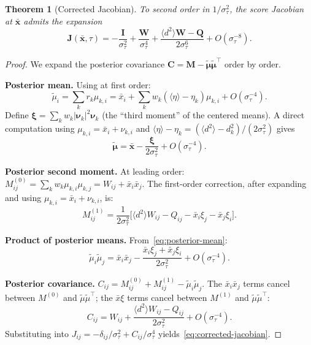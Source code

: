 \documentclass[10pt,a4paper]{amsart}
\newtheorem{theorem}{Theorem}
\begin{document}
\begin{theorem}[Corrected Jacobian]\label{thm:corrected-jacobian}
To second order in $1/\sigma_\tau^2$, the score Jacobian at $\bar{\bm{x}}$ admits the expansion
\begin{equation}\label{eq:corrected-jacobian}
  \bm{J}(\bar{\bm{x}},\tau)
  = -\frac{\bm{I}}{\sigma_\tau^2}
  + \frac{\bm{W}}{\sigma_\tau^4}
  + \frac{\langle d^2\rangle\bm{W} - \bm{Q}}{2\sigma_\tau^6}
  + O(\sigma_\tau^{-8}).
\end{equation}
\end{theorem}

\begin{proof}
We expand the posterior covariance $\bm{C} = \bm{M} - \tilde{\bm{\mu}}\tilde{\bm{\mu}}^\top$ order by order.

\medskip\noindent\textbf{Posterior mean.}
Using  at first order:
\[
  \tilde{\mu}_i = \sum_k r_k \mu_{k,i}
  = \bar{x}_i + \sum_k w_k(\langle\eta\rangle - \eta_k)\mu_{k,i} + O(\sigma_\tau^{-4}).
\]
Define $\bm{\xi} = \sum_k w_k|\bm{\nu}_k|^2\bm{\nu}_k$ (the ``third moment'' of the centered means).
A direct computation using $\mu_{k,i} = \bar{x}_i + \nu_{k,i}$ and $\langle\eta\rangle - \eta_k = (\langle d^2\rangle - d_k^2)/(2\sigma_\tau^2)$ gives
\begin{equation}\label{eq:posterior-mean}
  \tilde{\bm{\mu}} = \bar{\bm{x}} - \frac{\bm{\xi}}{2\sigma_\tau^2} + O(\sigma_\tau^{-4}).
\end{equation}

\medskip\noindent\textbf{Posterior second moment.}
At leading order: $M_{ij}^{(0)} = \sum_k w_k\mu_{k,i}\mu_{k,j} = W_{ij} + \bar{x}_i\bar{x}_j$.
The first-order correction, after expanding and using $\mu_{k,i} = \bar{x}_i + \nu_{k,i}$, is:
\begin{equation}\label{eq:M-correction}
  M_{ij}^{(1)} = \frac{1}{2\sigma_\tau^2}\bigl[\langle d^2\rangle W_{ij} - Q_{ij} - \bar{x}_i\xi_j - \bar{x}_j\xi_i\bigr].
\end{equation}

\medskip\noindent\textbf{Product of posterior means.}
From~\eqref{eq:posterior-mean}:
\[
  \tilde{\mu}_i\tilde{\mu}_j = \bar{x}_i\bar{x}_j - \frac{\bar{x}_i\xi_j + \bar{x}_j\xi_i}{2\sigma_\tau^2} + O(\sigma_\tau^{-4}).
\]

\medskip\noindent\textbf{Posterior covariance.}
$C_{ij} = M_{ij}^{(0)} + M_{ij}^{(1)} - \tilde{\mu}_i\tilde{\mu}_j$. The $\bar{x}_i\bar{x}_j$ terms cancel between $M^{(0)}$ and $\tilde{\mu}\tilde{\mu}^\top$; the $\bar{x}\xi$ terms cancel between $M^{(1)}$ and $\tilde{\mu}\tilde{\mu}^\top$:
\begin{equation}\label{eq:C-expansion}
  C_{ij} = W_{ij} + \frac{\langle d^2\rangle W_{ij} - Q_{ij}}{2\sigma_\tau^2} + O(\sigma_\tau^{-4}).
\end{equation}
Substituting into $J_{ij} = -\delta_{ij}/\sigma_\tau^2 + C_{ij}/\sigma_\tau^4$ yields~\eqref{eq:corrected-jacobian}.
\end{proof}
\end{document}
